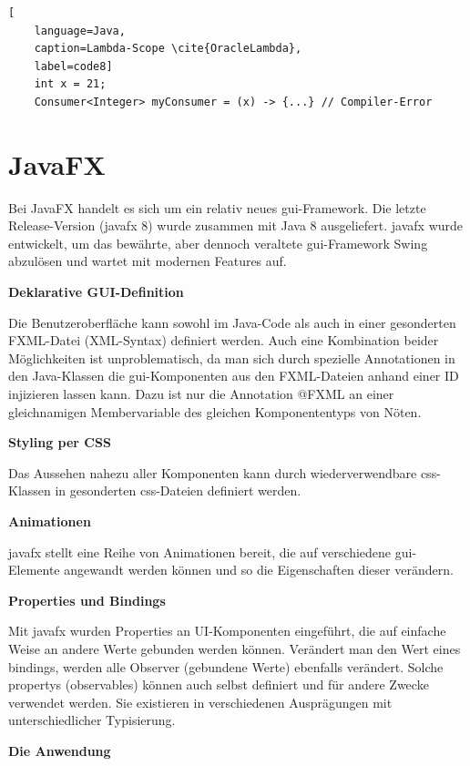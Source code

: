 \begin{lstlisting}[
    language=Java,
    caption=Lambda-Scope \cite{OracleLambda},
    label=code8]
	int x = 21;
	Consumer<Integer> myConsumer = (x) -> {...} // Compiler-Error
\end{lstlisting}

\section{JavaFX} \label{sec:grundJavaFX}
Bei JavaFX handelt es sich um ein relativ neues \gls{gui}-Framework. Die letzte Release-Version (\gls{javafx} 8) wurde zusammen mit Java 8 ausgeliefert. \gls{javafx} wurde entwickelt, um das bewährte, aber dennoch veraltete \gls{gui}-Framework Swing abzulösen und wartet mit modernen Features auf. \cite{Mueller2015}

\textbf{Deklarative GUI-Definition}

Die Benutzeroberfläche kann sowohl im Java-Code als auch in einer gesonderten FXML-Datei (XML-Syntax) definiert werden. Auch eine Kombination beider Möglichkeiten ist unproblematisch, da man sich durch spezielle Annotationen in den Java-Klassen die \gls{gui}-Komponenten aus den FXML-Dateien anhand einer ID injizieren lassen kann. Dazu ist nur die Annotation @FXML an einer gleichnamigen Membervariable des gleichen Komponententyps von Nöten.

\textbf{Styling per CSS}

Das Aussehen nahezu aller Komponenten kann durch wiederverwendbare \gls{css}-Klassen in gesonderten \gls{css}-Dateien definiert werden. \cite{Mueller2015}

\textbf{Animationen}

\gls{javafx} stellt eine Reihe von Animationen bereit, die auf verschiedene \gls{gui}-Elemente angewandt werden können und so die Eigenschaften dieser verändern. \cite{Mueller2015}

\textbf{Properties und Bindings}

Mit \gls{javafx} wurden Properties an UI-Komponenten eingeführt, die auf einfache Weise an andere Werte gebunden werden können. Verändert man den Wert eines \gls{binding}s, werden alle Observer (gebundene Werte) ebenfalls verändert. \cite{Mueller2015} Solche \glspl{property} (\gls{observable}s) können auch selbst definiert und für andere Zwecke verwendet werden. Sie existieren in verschiedenen Ausprägungen mit unterschiedlicher Typisierung. \cite{OracleBindings}

\textbf{Die Anwendung}

